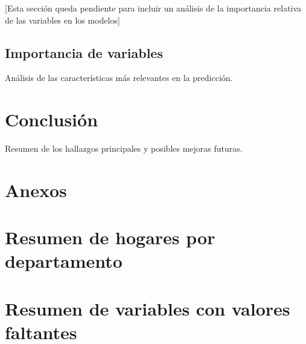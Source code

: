 \documentclass[12pt,a4paper,onecolumn]{article}
\begin{document}
[Esta sección queda pendiente para incluir un análisis de la importancia relativa de las variables en los modelos]

\subsection{Importancia de variables}
Análisis de las características más relevantes en la predicción.

\section{Conclusión}
Resumen de los hallazgos principales y posibles mejoras futuras.


\appendix
\section*{Anexos}

\section{Resumen de hogares por departamento}


\section{Resumen de variables con valores faltantes}
%


\pagebreak
\singlespacing
\nocite{*}


\end{document}
